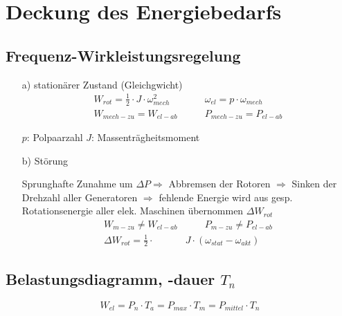 \section{Deckung des Energiebedarfs}
	\subsection{Frequenz-Wirkleistungsregelung}

	\begin{enumerate}
		\item[a)]{stationärer Zustand (Gleichgwicht)}
		\begin{align*}
			 W_{rot} = \frac{1}{2} \cdot J \cdot \omega_{mech} ^{2} &\qquad
			 \omega_{el} = p  \cdot \omega_{mech} \\
			 W_{mech-zu} = W_{el-ab} &\qquad
			 P_{mech-zu} = P_{el-ab}
		\end{align*}

		$p$: Polpaarzahl \quad
		$J$: Massenträgheitsmoment

		\item[b)]{Störung}

		Sprunghafte Zunahme um $ \Delta P \Rightarrow$
		Abbremsen der Rotoren $\Rightarrow$ Sinken der Drehzahl aller Generatoren
		$\Rightarrow$ fehlende Energie wird aus gesp. Rotationsenergie aller elek.
		Maschinen übernommen $\Delta W_{rot}$
		\begin{align*}
			W_{m-zu} \neq W_{el-ab} &\qquad
			P_{m-zu} \neq P_{el-ab} \\
			\Delta W_{rot} = \frac{1}{2} \cdot & J \cdot (\omega_{stat} - \omega_{akt})
		\end{align*}
	\end{enumerate}

	\subsection{Belastungsdiagramm, -dauer $T_{n}$}

\[ W_{el} = P_{n} \cdot T_{a} = P_{max} \cdot T_{m} = P_{mittel} \cdot T_{n} \]